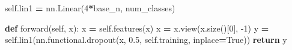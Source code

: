 \documentclass[10pt,a4paper]{article}
\newenvironment{Shaded}{\begin{snugshade}}{\end{snugshade}}
\newcommand{\ControlFlowTok}[1]{\textcolor[rgb]{0.13,0.29,0.53}{\textbf{#1}}}
\newcommand{\DecValTok}[1]{\textcolor[rgb]{0.00,0.00,0.81}{#1}}
\newcommand{\FloatTok}[1]{\textcolor[rgb]{0.00,0.00,0.81}{#1}}
\newcommand{\KeywordTok}[1]{\textcolor[rgb]{0.13,0.29,0.53}{\textbf{#1}}}
\newcommand{\NormalTok}[1]{#1}
\newcommand{\OperatorTok}[1]{\textcolor[rgb]{0.81,0.36,0.00}{\textbf{#1}}}
\newcommand{\VariableTok}[1]{\textcolor[rgb]{0.00,0.00,0.00}{#1}}
\theoremstyle{break}
\begin{document}
\begin{Shaded}
\begin{Highlighting}[]
        \VariableTok{self}\NormalTok{.lin1 }\OperatorTok{=}\NormalTok{ nn.Linear(}\DecValTok{4}\OperatorTok{*}\NormalTok{base_n, num_classes)}

    \KeywordTok{def}\NormalTok{ forward(}\VariableTok{self}\NormalTok{, x):}
\NormalTok{        x  }\OperatorTok{=} \VariableTok{self}\NormalTok{.features(x)}
\NormalTok{        x }\OperatorTok{=}\NormalTok{ x.view(x.size()[}\DecValTok{0}\NormalTok{], }\DecValTok{-1}\NormalTok{)}
\NormalTok{        y }\OperatorTok{=} \VariableTok{self}\NormalTok{.lin1(nn.functional.dropout(x, }\FloatTok{0.5}\NormalTok{, }\VariableTok{self}\NormalTok{.training, inplace}\OperatorTok{=}\VariableTok{True}\NormalTok{))}
        \ControlFlowTok{return}\NormalTok{ y}
\end{Highlighting}
\end{Shaded}
\end{document}
